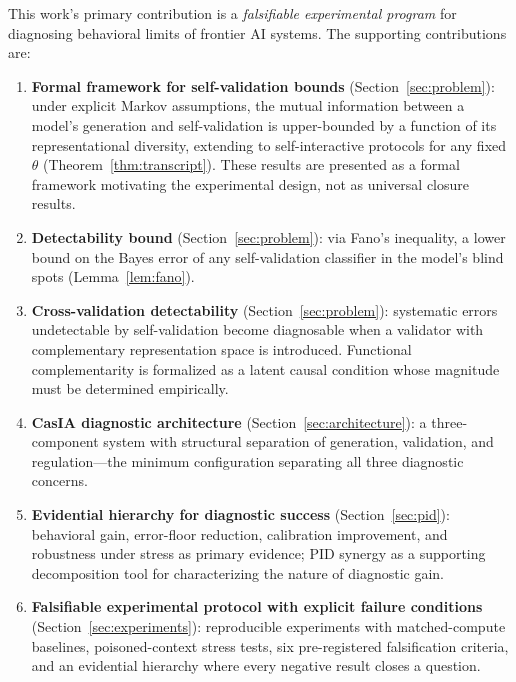 \documentclass[11pt,a4paper]{article}
\theoremstyle{definition}
\begin{document}
This work's primary contribution is a \emph{falsifiable experimental program} for diagnosing behavioral limits of frontier AI systems. The supporting contributions are:
\begin{enumerate}[leftmargin=*,itemsep=3pt]
\item \textbf{Formal framework for self-validation bounds} (Section~\ref{sec:problem}): under explicit Markov assumptions, the mutual information between a model's generation and self-validation is upper-bounded by a function of its representational diversity, extending to self-interactive protocols for any fixed $\theta$ (Theorem~\ref{thm:transcript}). These results are presented as a formal framework motivating the experimental design, not as universal closure results.
\item \textbf{Detectability bound} (Section~\ref{sec:problem}): via Fano's inequality, a lower bound on the Bayes error of any self-validation classifier in the model's blind spots (Lemma~\ref{lem:fano}).
\item \textbf{Cross-validation detectability} (Section~\ref{sec:problem}): systematic errors undetectable by self-validation become diagnosable when a validator with complementary representation space is introduced. Functional complementarity is formalized as a latent causal condition whose magnitude must be determined empirically.
\item \textbf{CasIA diagnostic architecture} (Section~\ref{sec:architecture}): a three-component system with structural separation of generation, validation, and regulation---the minimum configuration separating all three diagnostic concerns.
\item \textbf{Evidential hierarchy for diagnostic success} (Section~\ref{sec:pid}): behavioral gain, error-floor reduction, calibration improvement, and robustness under stress as primary evidence; PID synergy as a supporting decomposition tool for characterizing the nature of diagnostic gain.
\item \textbf{Falsifiable experimental protocol with explicit failure conditions} (Section~\ref{sec:experiments}): reproducible experiments with matched-compute baselines, poisoned-context stress tests, six pre-registered falsification criteria, and an evidential hierarchy where every negative result closes a question.
\end{enumerate}


\end{document}
